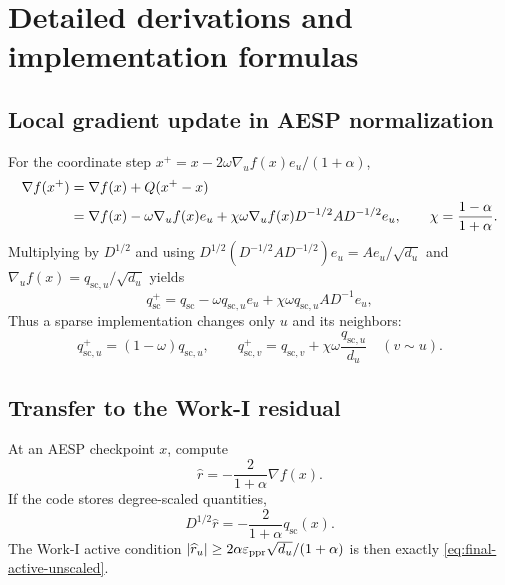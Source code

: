 \section{Detailed derivations and implementation formulas}
\label{app:derivations}

\subsection{Local gradient update in AESP normalization}

For the coordinate step
\(
 x^+=x-2\omega\nabla_u f(x)e_u/(1+\alpha)
\),
\begin{align}
  \nabla f(x^+)
  &=\nabla f(x)+Q(x^+-x)
  \notag\\
  &=\nabla f(x)-\omega\nabla_u f(x)e_u
    +\chi\omega\nabla_u f(x)D^{-1/2}AD^{-1/2}e_u,
  \qquad
  \chi=\frac{1-\alpha}{1+\alpha}.
  \label{eq:app-gradient-update}
\end{align}
Multiplying by \(D^{1/2}\) and using
\(
D^{1/2}(D^{-1/2}AD^{-1/2})e_u=Ae_u/\sqrt{d_u}
\)
and \(\nabla_u f(x)=q_{\mathrm{sc},u}/\sqrt{d_u}\) yields
\begin{equation}
    q_{\mathrm{sc}}^+
    =q_{\mathrm{sc}}-\omega q_{\mathrm{sc},u}e_u
     +\chi\omega q_{\mathrm{sc},u}AD^{-1}e_u,
    \label{eq:app-scaled-update}
\end{equation}
Thus a sparse implementation changes only \(u\) and its neighbors:
\begin{equation}
    q_{\mathrm{sc},u}^+=(1-\omega)q_{\mathrm{sc},u},
    \qquad
    q_{\mathrm{sc},v}^+
    =q_{\mathrm{sc},v}+\chi\omega\frac{q_{\mathrm{sc},u}}{d_u}
    \quad(v\sim u).
    \label{eq:app-coordinate-updates}
\end{equation}

\subsection{Transfer to the Work-I residual}

At an AESP checkpoint \(x\), compute
\begin{equation}
    \widehat r
    =-\frac{2}{1+\alpha}\nabla f(x).
    \label{eq:app-handoff-residual}
\end{equation}
If the code stores degree-scaled quantities,
\begin{equation}
    D^{1/2}\widehat r
    =-\frac{2}{1+\alpha}q_{\mathrm{sc}}(x).
    \label{eq:app-handoff-scaled}
\end{equation}
The Work-I active condition
\(
\left\lvert \widehat r_u\right\rvert\geq 2\alpha\varepsilon_{\mathrm{ppr}}\sqrt{d_u}/(1+\alpha)
\)
is then exactly \cref{eq:final-active-unscaled}.

